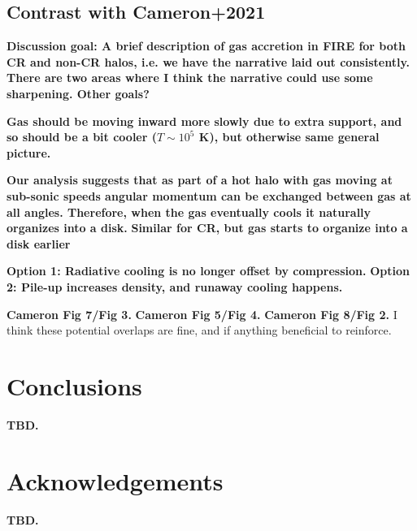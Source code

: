\documentclass[fleqn,usenatbib]{mnras}
\begin{document}
\subsection{Contrast with Cameron+2021}

\textbf{
Discussion goal:
A brief description of gas accretion in FIRE for both CR and non-CR halos, i.e. we have the narrative laid out consistently.
There are two areas where I think the narrative could use some sharpening.
Other goals?
}

\textbf{Gas should be moving inward more slowly due to extra support, and so should be a bit cooler ($T\sim 10^5$ K), but otherwise same general picture.}

\textbf{
Our analysis suggests that as part of a hot halo with gas moving at sub-sonic speeds angular momentum can be exchanged between gas at all angles.
Therefore, when the gas eventually cools it naturally organizes into a disk.
}
\textbf{
Similar for CR, but gas starts to organize into a disk earlier
}

\textbf{Option 1: Radiative cooling is no longer offset by compression.}
\textbf{Option 2: Pile-up increases density, and runaway cooling happens.}


\textbf{Cameron Fig 7/Fig 3.}
\textbf{Cameron Fig 5/Fig 4.}
\textbf{Cameron Fig 8/Fig 2.}
I think these potential overlaps are fine, and if anything beneficial to reinforce.

\section{Conclusions}

\textbf{TBD.}

\section*{Acknowledgements}

\textbf{TBD.}






\end{document}
